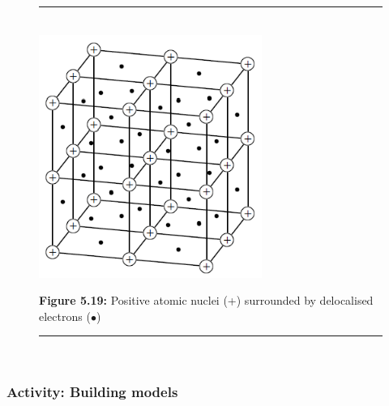         
    \setcounter{subfigure}{0}


	\begin{figure}[H] %
    \begin{center}
    \rule[.1in]{\figurerulewidth}{.005in} \\
        \label{m38694*uid78!!!underscore!!!media}\label{m38694*uid78!!!underscore!!!printimage}\includegraphics[height=300px]{col11305.imgs/m38694_CG11C1_022.png} %
        
      \vspace{2pt}
    \vspace{\rubberspace}\par \begin{cnxcaption}
	  \small \textbf{Figure 5.19: }Positive atomic nuclei (+) surrounded by delocalised electrons (\begin{math}\ensuremath{\bullet}\end{math})
	\end{cnxcaption}
      
    \vspace{.1in}
    \rule[.1in]{\figurerulewidth}{.005in} \\
        
    \end{center}

 \end{figure}   

    \addtocounter{footnote}{-0}
    
      
      
        \label{m38694*id754}
            \subsubsection{ Activity: Building models}
            \nopagebreak
            
